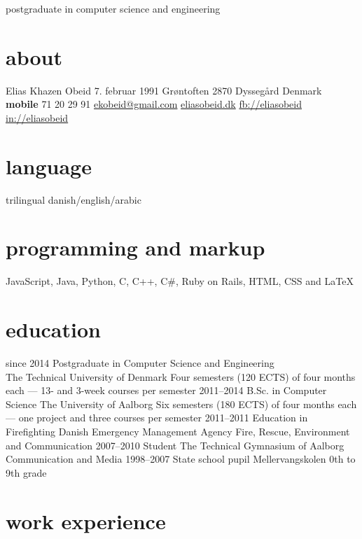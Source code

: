 \documentclass[print]{friggeri-cv}
\begin{document}
    {postgraduate in computer science and engineering}

\begin{aside}
  \section{about}
    Elias Khazen Obeid
    7. februar 1991
    Grøntoften 
    2870 Dyssegård
    Denmark
    ~
    \textbf{mobile} 71 20 29 91
    \href{mailto:ekobeid@gmail.com}{ekobeid@gmail.com}
    \href{http://eliasobeid.dk}{eliasobeid.dk}
    \href{http://facebook.com/eliaskhazenobeid}{fb://eliasobeid}
    \href{http://www.linkedin.com/in/eliasobeid}{in://eliasobeid}
  \section{language}
    trilingual danish/english/arabic
  \section{programming and markup}
    JavaScript, Java,
    Python, C, C++, C\#,
    Ruby on Rails,
    HTML, CSS and \LaTeX{}
\end{aside}

\section{education}

\begin{entrylist}
  \entry
    {since 2014}
    {Postgraduate {\normalfont in Computer Science and Engineering}\\}
    {The Technical University of Denmark}
    {Four semesters (120 ECTS) of four months each --- 13- and 3-week courses per semester}
  \entry
    {2011–2014}
    {B.Sc. {\normalfont in Computer Science}}
    {The University of Aalborg}
    {Six semesters (180 ECTS) of four months each --- one project and three courses per semester}
  \entry
    {2011–2011}
    {Education in Firefighting}
    {Danish Emergency Management Agency}
    {Fire, Rescue, Environment and Communication}
  \entry
    {2007–2010}
    {Student}
    {The Technical Gymnasium of Aalborg}
    {Communication and Media}
  \entry
    {1998–2007}
    {State school pupil}
    {Mellervangskolen}
    {0th to 9th grade}
\end{entrylist}

\section{work experience}
\end{document}
